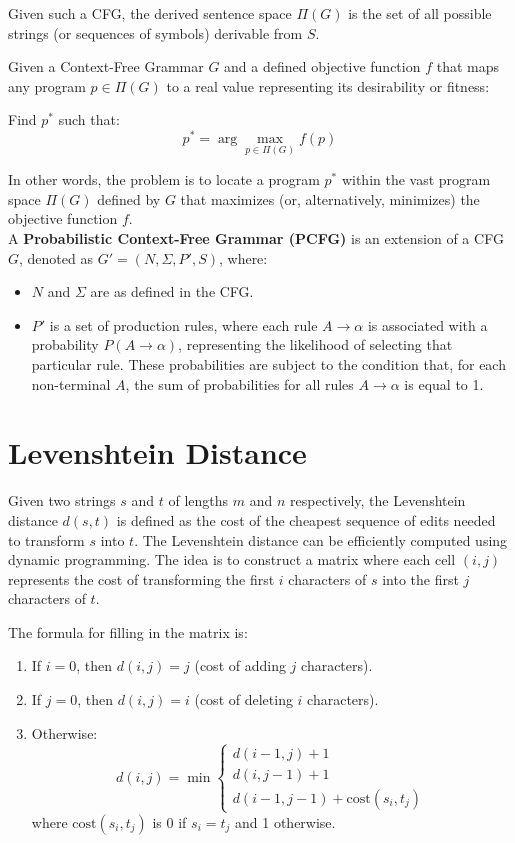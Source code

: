 Given such a CFG, the derived sentence space \( \Pi(G) \) is the set of all possible strings (or sequences of symbols) derivable from \( S \).

Given a Context-Free Grammar \( G \) and a defined objective function \( f \) that maps any program \( p \in \Pi(G) \) to a real value representing its desirability or fitness:

Find \( p^* \) such that:
\[ p^* = \arg\max_{p \in \Pi(G)} f(p) \]

In other words, the problem is to locate a program \( p^* \) within the vast program space \( \Pi(G) \) defined by \( G \) that maximizes (or, alternatively, minimizes) the objective function \( f \). \\

\noindent A \textbf{Probabilistic Context-Free Grammar (PCFG)} is an extension of a CFG \( G \), denoted as \( G' = (N, \Sigma, P', S) \), where:

\begin{itemize}
    \item \( N \) and \( \Sigma \) are as defined in the CFG.
    \item \( P' \) is a set of production rules, where each rule \( A \rightarrow \alpha \) is associated with a probability \( P(A \rightarrow \alpha) \), representing the likelihood of selecting that particular rule. These probabilities are subject to the condition that, for each non-terminal \( A \), the sum of probabilities for all rules \( A \rightarrow \alpha \) is equal to 1.
\end{itemize}


\clearpage
\section{Levenshtein Distance}\label{app:levenshtein}
Given two strings \( s \) and \( t \) of lengths \( m \) and \( n \) respectively, the Levenshtein distance \( d(s, t) \) is defined as the cost of the cheapest sequence of edits needed to transform \( s \) into \( t \). 
The Levenshtein distance can be efficiently computed using dynamic programming. The idea is to construct a matrix where each cell \( (i, j) \) represents the cost of transforming the first \( i \) characters of \( s \) into the first \( j \) characters of \( t \). 

The formula for filling in the matrix is:
\begin{enumerate}
    \item If \( i = 0 \), then \( d(i, j) = j \) (cost of adding \( j \) characters).
    \item If \( j = 0 \), then \( d(i, j) = i \) (cost of deleting \( i \) characters).
    \item Otherwise:   \[
        d(i, j) = \min \begin{cases} 
        d(i-1, j) + 1 \\ 
        d(i, j-1) + 1 \\ 
        d(i-1, j-1) + \text{cost}(s_i, t_j) 
        \end{cases}
        \]
        where \( \text{cost}(s_i, t_j) \) is 0 if \( s_i = t_j \) and 1 otherwise.
\end{enumerate}

